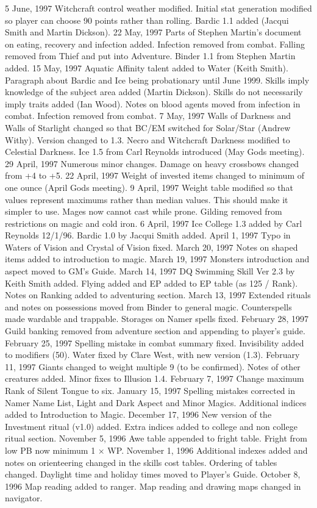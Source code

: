 \documentclass[a4paper]{article}
\begin{document}
\begin{multicols}{3}
5 June, 1997 Witchcraft control weather modified.
Initial stat generation modified so player can
choose 90 points rather than rolling. Bardic 1.1
added (Jacqui Smith and Martin Dickson).
22 May, 1997 Parts of Stephen Martin’s document
on eating, recovery and infection added. Infection
removed from combat. Falling removed from Thief
and put into Adventure. Binder 1.1 from Stephen
Martin added.
15 May, 1997 Aquatic Affinity talent added to
Water (Keith Smith). Paragraph about Bardic and
Ice being probationary until June 1999. Skills
imply knowledge of the subject area added (Martin
Dickson). Skills do not necessarily imply traits
added (Ian Wood).
Notes on blood agents moved from infection in
combat. Infection removed from combat.
7 May, 1997 Walls of Darkness and Walls of Starlight changed so that BC/EM switched for Solar/Star (Andrew Withy). Version changed to 1.3.
Necro and Witchcraft Darkness modified to Celestial Darkness. Ice 1.5 from Carl Reynolds introduced (May Gods meeting).
29 April, 1997 Numerous minor changes. Damage
on heavy crossbows changed from +4 to +5.
22 April, 1997 Weight of invested items changed
to minimum of one ounce (April Gods meeting).
9 April, 1997 Weight table modified so that values
represent maximums rather than median values.
This should make it simpler to use. Mages now
cannot cast while prone. Gilding removed from
restrictions on magic and cold iron.
6 April, 1997 Ice College 1.3 added by Carl Reynolds 12/1/96. Bardic 1.0 by Jacqui Smith added.
April 1, 1997 Typo in Waters of Vision and Crystal
of Vision fixed.
March 20, 1997 Notes on shaped items added to
introduction to magic.
March 19, 1997 Monsters introduction and aspect
moved to GM’s Guide.
March 14, 1997 DQ Swimming Skill Ver 2.3 by
Keith Smith added. Flying added and EP added to
EP table (as 125 / Rank). Notes on Ranking added
to adventuring section.
March 13, 1997 Extended rituals and notes on
possessions moved from Binder to general magic.
Counterspells made wardable and trappable. Storages on Namer spells fixed.
February 28, 1997 Guild banking removed from
adventure section and appending to player’s guide.
February 25, 1997 Spelling mistake in combat
summary fixed. Invisibility added to modifiers (50). Water fixed by Clare West, with new version
(1.3).
February 11, 1997 Giants changed to weight multiple 9 (to be confirmed). Notes of other creatures
added. Minor fixes to Illusion 1.4.
February 7, 1997 Change maximum Rank of Silent
Tongue to six.
January 15, 1997 Spelling mistakes corrected in
Namer Name List, Light and Dark Aspect and
Minor Magics. Additional indices added to Introduction to Magic.
December 17, 1996 New version of the Investment
ritual (v1.0) added. Extra indices added to college
and non college ritual section.
November 5, 1996 Awe table appended to fright
table. Fright from low PB now minimum 1 × WP.
November 1, 1996 Additional indexes added and
notes on orienteering changed in the skills cost
tables. Ordering of tables changed. Daylight time
and holiday times moved to Player’s Guide.
October 8, 1996 Map reading added to ranger. Map
reading and drawing maps changed in navigator.


\end{multicols}
\end{document}
